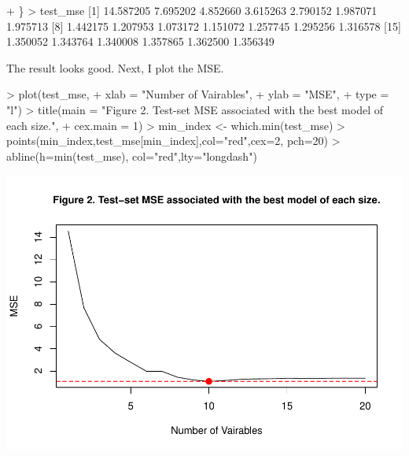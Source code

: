 \documentclass[
]{article}
\newenvironment{Shaded}{\begin{snugshade}}{\end{snugshade}}
\newcommand{\AttributeTok}[1]{\textcolor[rgb]{0.77,0.63,0.00}{#1}}
\newcommand{\DecValTok}[1]{\textcolor[rgb]{0.00,0.00,0.81}{#1}}
\newcommand{\FloatTok}[1]{\textcolor[rgb]{0.00,0.00,0.81}{#1}}
\newcommand{\FunctionTok}[1]{\textcolor[rgb]{0.00,0.00,0.00}{#1}}
\newcommand{\NormalTok}[1]{#1}
\newcommand{\OtherTok}[1]{\textcolor[rgb]{0.56,0.35,0.01}{#1}}
\newcommand{\SpecialCharTok}[1]{\textcolor[rgb]{0.00,0.00,0.00}{#1}}
\newcommand{\StringTok}[1]{\textcolor[rgb]{0.31,0.60,0.02}{#1}}
\begin{document}
\begin{Shaded}
\begin{Highlighting}[]
\SpecialCharTok{+}\NormalTok{ \}}
\SpecialCharTok{\textgreater{}}\NormalTok{ test\_mse}
\NormalTok{ [}\DecValTok{1}\NormalTok{] }\FloatTok{14.587205}  \FloatTok{7.695202}  \FloatTok{4.852660}  \FloatTok{3.615263}  \FloatTok{2.790152}  \FloatTok{1.987071}  \FloatTok{1.975713}
\NormalTok{ [}\DecValTok{8}\NormalTok{]  }\FloatTok{1.442175}  \FloatTok{1.207953}  \FloatTok{1.073172}  \FloatTok{1.151072}  \FloatTok{1.257745}  \FloatTok{1.295256}  \FloatTok{1.316578}
\NormalTok{[}\DecValTok{15}\NormalTok{]  }\FloatTok{1.350052}  \FloatTok{1.343764}  \FloatTok{1.340008}  \FloatTok{1.357865}  \FloatTok{1.362500}  \FloatTok{1.356349}
\end{Highlighting}
\end{Shaded}

The result looks good. Next, I plot the MSE.

\begin{Shaded}
\begin{Highlighting}[]
\SpecialCharTok{\textgreater{}} \FunctionTok{plot}\NormalTok{(test\_mse,}
\SpecialCharTok{+}      \AttributeTok{xlab =} \StringTok{"Number of Vairables"}\NormalTok{,}
\SpecialCharTok{+}      \AttributeTok{ylab =} \StringTok{"MSE"}\NormalTok{,}
\SpecialCharTok{+}      \AttributeTok{type =} \StringTok{"l"}\NormalTok{)}
\SpecialCharTok{\textgreater{}} \FunctionTok{title}\NormalTok{(}\AttributeTok{main =} \StringTok{"Figure 2. Test{-}set MSE associated with the best model of each size."}\NormalTok{, }
\SpecialCharTok{+}       \AttributeTok{cex.main =} \DecValTok{1}\NormalTok{)}
\SpecialCharTok{\textgreater{}}\NormalTok{ min\_index }\OtherTok{\textless{}{-}} \FunctionTok{which.min}\NormalTok{(test\_mse)}
\SpecialCharTok{\textgreater{}} \FunctionTok{points}\NormalTok{(min\_index,test\_mse[min\_index],}\AttributeTok{col=}\StringTok{"red"}\NormalTok{,}\AttributeTok{cex=}\DecValTok{2}\NormalTok{, }\AttributeTok{pch=}\DecValTok{20}\NormalTok{)}
\SpecialCharTok{\textgreater{}} \FunctionTok{abline}\NormalTok{(}\AttributeTok{h=}\FunctionTok{min}\NormalTok{(test\_mse), }\AttributeTok{col=}\StringTok{"red"}\NormalTok{,}\AttributeTok{lty=}\StringTok{"longdash"}\NormalTok{)}
\end{Highlighting}
\end{Shaded}

\includegraphics[width=0.5\linewidth,height=0.5\textheight]{Homework_10_Pan_files/figure-latex/unnamed-chunk-6-1}
\end{document}
